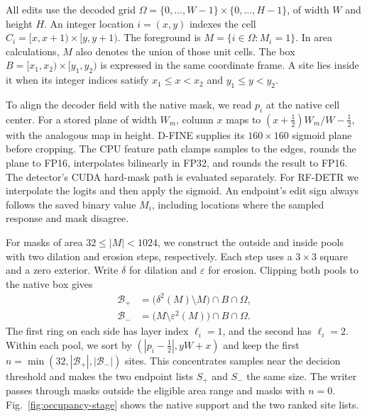 \documentclass[journal]{IEEEtran}
\newif\ifnativecases
\begin{document}
All edits use the decoded grid \(\Omega=\{0,\ldots,W-1\}\times\{0,\ldots,H-1\}\), of width \(W\) and height \(H\). An integer location \(i=(x,y)\) indexes the cell \(C_i=[x,x+1)\times[y,y+1)\). The foreground is \(M=\{i\in\Omega:M_i=1\}\). In area calculations, \(M\) also denotes the union of those unit cells. The box \(B=[x_1,x_2)\times[y_1,y_2)\) is expressed in the same coordinate frame. A site lies inside it when its integer indices satisfy \(x_1\le x<x_2\) and \(y_1\le y<y_2\).

To align the decoder field with the native mask, we read \(p_i\) at the native cell center. For a stored plane of width \(W_m\), column \(x\) maps to \((x+\tfrac12)W_m/W-\tfrac12\), with the analogous map in height. D-FINE supplies its \(160\times160\) sigmoid plane before cropping. The CPU feature path clamps samples to the edges, rounds the plane to FP16, interpolates bilinearly in FP32, and rounds the result to FP16. The detector's CUDA hard-mask path is evaluated separately. For RF-DETR we interpolate the logits and then apply the sigmoid. An endpoint's edit sign always follows the saved binary value \(M_i\), including locations where the sampled response and mask disagree.

For masks of area \(32\le |M|<1024\), we construct the outside and inside pools with two dilation and erosion steps, respectively. Each step uses a \(3\times3\) square and a zero exterior. Write \(\delta\) for dilation and \(\varepsilon\) for erosion. Clipping both pools to the native box gives
\begin{equation}
\begin{aligned}
 \mathcal B_+ &= \bigl(\delta^2(M)\setminus M\bigr)\cap B\cap\Omega,\\
 \mathcal B_- &= \bigl(M\setminus\varepsilon^2(M)\bigr)\cap B\cap\Omega .
\end{aligned}
\label{eq:native-bands}
\end{equation}
The first ring on each side has layer index \(\ell_i=1\), and the second has \(\ell_i=2\). Within each pool, we sort by \((|p_i-\tfrac12|,yW+x)\) and keep the first \(n=\min(32,|\mathcal B_+|,|\mathcal B_-|)\) sites. This concentrates samples near the decision threshold and makes the two endpoint lists \(S_+\) and \(S_-\) the same size. The writer passes through masks outside the eligible area range and masks with \(n=0\). Fig.~\ref{fig:occupancy-stage} shows the native support and the two ranked site lists.

\ifnativecases The sampling example traces the boundary of the retained Instance-RSDD mask. Its bounding box and ranking scores illustrate how the site lists are constructed.\fi
\end{document}
